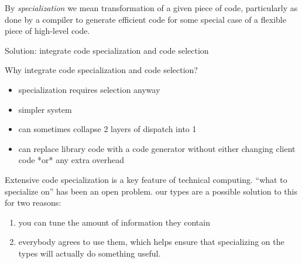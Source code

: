By \emph{specialization} we mean transformation of a given piece of code,
particularly as done by a compiler to generate efficient code for some
special case of a flexible piece of high-level code.


Solution: integrate code specialization and code selection

Why integrate code specialization and code selection?

\begin{itemize}
\item specialization requires selection anyway
\item simpler system
\item can sometimes collapse 2 layers of dispatch into 1
\item can replace library code with a code generator without either changing
  client code *or* any extra overhead
\end{itemize}

Extensive code specialization is a key feature of
technical computing. ``what to specialize on'' has been an open problem.
our types are a possible solution to this for two reasons:

\begin{enumerate}
\item you can tune the amount of information they contain
\item everybody agrees to use them, which helps ensure that specializing on
  the types will actually do something useful.
\end{enumerate}





